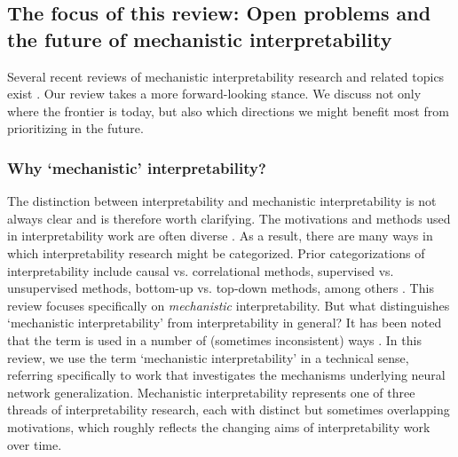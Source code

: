 \subsection{The focus of this review: Open problems and the future of mechanistic interpretability}
\label{subsec:review-focus}

Several recent reviews of mechanistic interpretability research and related topics exist \citep{rauker2023transparentaisurveyinterpreting,Geiger_2022_CausalStructure,Bereska_2024_MechInterpReview, ferrando2024primerinnerworkingstransformerbased,rai2024practicalreviewmechanisticinterpretability,anwar2024foundationalchallengesassuringalignment,davies2024cognitiverevolutioninterpretabilityexplaining,mosbach2024insightsactionsimpactinterpretability, mueller2024questrightmediatorhistory}. Our review takes a more forward-looking stance. We discuss not only where the frontier is today, but also which directions we might benefit most from prioritizing in the future.

\subsubsection{Why `mechanistic' interpretability?}
\label{subsec:mechanistic}

The distinction between interpretability and mechanistic interpretability is not always clear and is therefore worth clarifying.
The motivations and methods used in interpretability work are often diverse \citep{Lipton_2016_InterpretabilityMotivations,doshivelez2017rigorousscienceinterpretablemachine,Jacovi_2023_ExplainableAiLiterature}. As a result, there are many ways in which interpretability research might be categorized. Prior categorizations of interpretability include causal vs. correlational methods, supervised vs. unsupervised methods, bottom-up vs. top-down methods, among others \citep{geiger2021causalabstractionsneuralnetworks, mueller2024questrightmediatorhistory,Bereska_2024_MechInterpReview,Belinkov_2022_ProbingClassifiers,zou2023representationengineeringtopdownapproach, davies2024cognitiverevolutioninterpretabilityexplaining}. This review focuses specifically on \textit{mechanistic} interpretability. But what distinguishes `mechanistic interpretability' from interpretability in general? It has been noted that the term is used in a number of (sometimes inconsistent) ways \citep{saphra2024mechanistic}. In this review, we use the term `mechanistic interpretability' in a technical sense, referring specifically to work that investigates the mechanisms underlying neural network generalization. Mechanistic interpretability represents one of three threads of interpretability research, each with distinct but sometimes overlapping motivations, which roughly reflects the changing aims of interpretability work over time.

